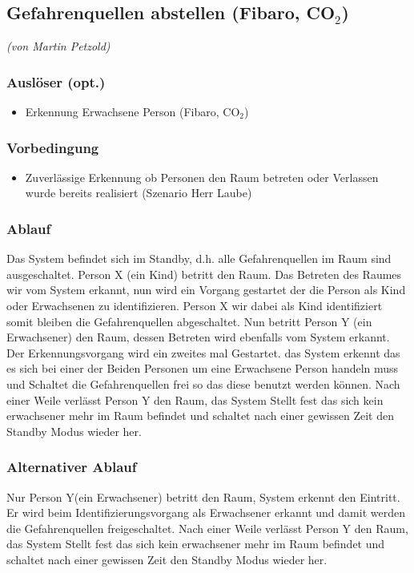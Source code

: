 \subsection{Gefahrenquellen abstellen (Fibaro, CO$_2$)}
\emph{(von Martin Petzold)}
\subsubsection{Auslöser (opt.)}
\begin{itemize}
	\item Erkennung Erwachsene Person (Fibaro, CO$_2$)
\end{itemize}

\subsubsection{Vorbedingung}
\begin{itemize}
	\item Zuverlässige Erkennung ob Personen den Raum betreten oder Verlassen wurde bereits realisiert (Szenario Herr Laube)
\end{itemize}

\subsubsection{Ablauf}
Das System befindet sich im Standby, d.h. alle Gefahrenquellen im Raum sind ausgeschaltet. Person X (ein Kind) betritt den Raum. Das Betreten des Raumes wir vom System erkannt, nun wird ein Vorgang gestartet der die Person als Kind oder Erwachsenen zu identifizieren. Person X wir dabei als Kind identifiziert somit bleiben die Gefahrenquellen abgeschaltet. 
Nun betritt Person Y (ein Erwachsener) den Raum, dessen Betreten wird ebenfalls vom System erkannt. Der Erkennungsvorgang wird ein zweites mal Gestartet. das System erkennt das es sich bei einer der Beiden Personen um eine Erwachsene Person handeln muss und Schaltet die Gefahrenquellen frei so das diese benutzt werden können.
Nach einer Weile verlässt Person Y den Raum, das System Stellt fest das sich kein erwachsener mehr im Raum befindet und schaltet nach einer gewissen Zeit den Standby Modus wieder her.

\subsubsection{Alternativer Ablauf}
Nur Person Y(ein Erwachsener)  betritt den Raum, System erkennt den Eintritt. Er wird beim Identifizierungsvorgang als Erwachsener erkannt und damit werden die Gefahrenquellen freigeschaltet.
Nach einer Weile verlässt Person Y den Raum, das System Stellt fest das sich kein erwachsener mehr im Raum befindet und schaltet nach einer gewissen Zeit den Standby Modus wieder her.

